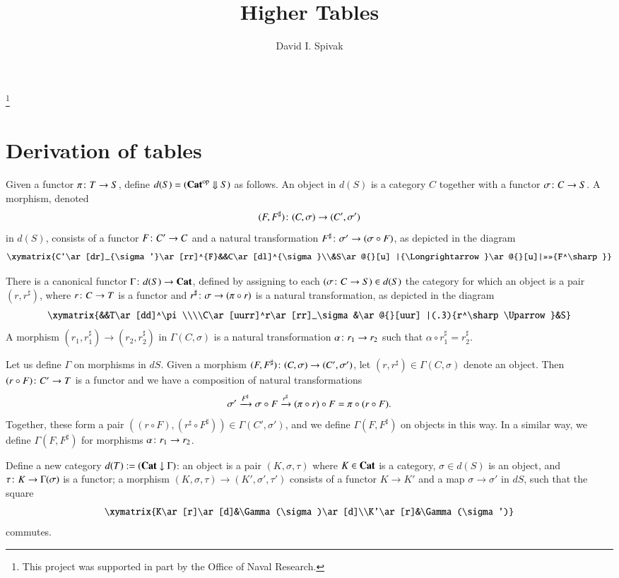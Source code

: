 \documentclass{amsart}
\makeatletter
\def\Down{\Downarrow}
\newcommand{\TriRight}[7]{\xymatrix{#1\ar[dr]_{#2}\ar[rr]^{#3}&&#4\ar[dl]^{#5}\\&#6\ar@{}[u] |{\Longrightarrow}\ar@{}[u]|>>>>{#7}}}
\makeatother
\begin{document}
\author{David I. Spivak}

\thanks{This project was supported in part by the Office of Naval Research.}

\title{Higher Tables}

\maketitle

\section{Derivation of tables}

Given a functor $\pi\colon T\rightarrow S$, define $d(S)=(\Cat\op\Down S)$ as follows.  An object in $d(S)$ is a category $C$ together with a functor $\sigma\colon C\rightarrow S$.  A morphism, denoted $$(F,F^\sharp)\colon(C,\sigma)\rightarrow(C',\sigma')$$ in $d(S)$, consists of a functor $F\colon C'\rightarrow C$ and a natural transformation $F^\sharp\colon \sigma'\rightarrow(\sigma\circ F)$, as depicted in the diagram $$\TriRight{C'}{\sigma'}{F}{C}{\sigma}{S}{F^\sharp}$$

There is a canonical functor $\Gamma\colon d(S)\rightarrow{\bf Cat}$, defined by assigning to each $(\sigma\colon C\rightarrow S)\in d(S)$ the category for which an object is a pair $(r,r^\sharp)$, where $r\colon C\rightarrow T$ is a functor and $r^\sharp\colon\sigma\rightarrow(\pi\circ r)$ is a natural transformation, as depicted in the diagram $$\xymatrix{&&T\ar[dd]^\pi\\\\C\ar[uurr]^r\ar[rr]_\sigma&\ar@{}[uur] |(.3){r^\sharp\Uparrow}&S}$$  A morphism $(r_1,r_1^\sharp)\to(r_2,r_2^\sharp)$ in $\Gamma(C,\sigma)$ is a natural transformation $\alpha\colon r_1\rightarrow r_2$ such that $\alpha\circ r_1^\sharp=r_2^\sharp$.

Let us define $\Gamma$ on morphisms in $dS$.  Given a morphism $(F,F^\sharp)\colon (C,\sigma)\rightarrow(C',\sigma')$, let $(r,r^\sharp)\in\Gamma(C,\sigma)$ denote an object.  Then $(r\circ F)\colon C'\rightarrow T$ is a functor and we have a composition of natural transformations $$\sigma'\xrightarrow{F^\sharp}\sigma\circ F\xrightarrow{r^\sharp}(\pi\circ r)\circ F=\pi\circ(r\circ F).$$  Together, these form a pair $((r\circ F),(r^\sharp\circ F^\sharp))\in\Gamma(C',\sigma')$, and we define $\Gamma(F,F^\sharp)$ on objects in this way.  In a similar way, we define $\Gamma(F,F^\sharp)$ for morphisms $\alpha\colon r_1\rightarrow r_2$.

Define a new category $d(T):=({\bf Cat}\downarrow\Gamma)$: an object is a pair $(K,\sigma,\tau)$ where $K\in{\bf Cat}$ is a category, $\sigma\in d(S)$ is an object, and $\tau\colon K\rightarrow\Gamma(\sigma)$ is a functor; a morphism $(K,\sigma,\tau)\to(K',\sigma',\tau')$ consists of a functor $K\to K'$ and a map $\sigma\to\sigma'$ in $dS$, such that the square $$\xymatrix{K\ar[r]\ar[d]&\Gamma(\sigma)\ar[d]\\K'\ar[r]&\Gamma(\sigma')}$$ commutes.  
\end{document}
